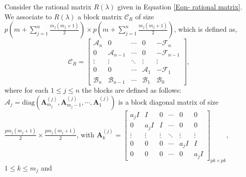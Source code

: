 \documentclass[12pt, reqno]{amsart}
\theoremstyle{definition}
\theoremstyle{remark}
\numberwithin{equation}{section}
\begin{document}
Consider the rational matrix $R(\lambda)$ given in Equation 
\eqref{Eqn- rational matrix}. We associate to $R(\lambda)$ a block 
matrix $\mathcal{C}_R$ of size \small{$p\left(m + \displaystyle \sum_{j=1}^{n}
\frac{m_j(m_j+1)}{2}\right) \times p\left(m + \displaystyle \sum_{j=1}^{n}
\frac{m_j(m_j+1)}{2}\right)$}, which is defined as,
\begin{equation}\label{Eqn-Block matrix}
\mathcal{C}_R= \begin{bmatrix}
\mathcal{A}_n & 0 & \cdots & 0 & -\mathcal{F}_n \\
0 & \mathcal{A}_{n-1} & \cdots & 0 & -\mathcal{F}_{n-1} \\
\vdots & \vdots & \ddots & \vdots & \vdots \\
0 & 0 & \cdots & \mathcal{A}_1 & -\mathcal{F}_1 \\
\mathcal{B}_n & \mathcal{B}_{n-1} & \cdots & \mathcal{B}_1 & \mathcal{B}_0
\end{bmatrix},
\end{equation}
where for each $1 \leq j \leq n$ the blocks are defined as follows: \\
$\mathcal{A}_j = \text{diag}(\textbf{A}_{m_j}^{(j)},\textbf{A}_{m_j-1}^{(j)},
\cdots,\textbf{A}_1^{(j)})$ is a block diagonal matrix of size $\displaystyle 
\frac{pm_j(m_j+1)}{2} \times \frac{pm_j(m_j+1)}{2}$, with $\textbf{A}_k^{(j)} 
=\begin{bmatrix}
a_jI & I & 0 & \cdots & 0 & 0 \\
0 & a_jI & I & \cdots & 0 & 0 \\
\vdots & \vdots & \vdots & \ddots & \vdots & \vdots \\
0 & 0 & 0 & \cdots & a_jI & I \\
0 & 0 & 0 & \cdots & 0 & a_jI
\end{bmatrix}_{pk \times pk}$, $1\leq k \leq m_j$ and 
\end{document}
